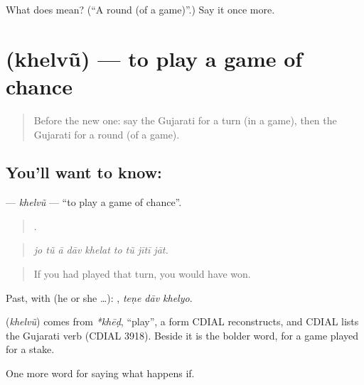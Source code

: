 \begin{tcolorbox}[breakable,colback=teal!4,colframe=teal!35!black,title={Before you move on}]
What does  mean? (\textquotedblleft{}A round (of a game)\textquotedblright{}.) Say it once more.
\end{tcolorbox}
\section[\texorpdfstring{\gu{ખેલવું} (khelvũ)}{ખેલવું (khelvũ)}]{ (khelvũ) — to play a game of chance}

\label{lesson:GU-C533-khelvu}



\begin{quote}
Before the new one: say the Gujarati for a turn (in a game), then the Gujarati for a round (of a game).
\end{quote}

\subsection*{You'll want to know: }
\textbf{} — \emph{khelvũ} — \textquotedblleft{}to play a game of chance\textquotedblright{}.

\begin{quote}
        .
\end{quote}

\begin{quote}
\emph{jo tũ ā dāv khelat to tũ jītī jāt.}
\end{quote}

\begin{quote}
If you had played that turn, you would have won.
\end{quote}

Past, with  (he or she …):   , \emph{teṇe dāv khelyo}.

\begin{cousinweb}
\textbf{} (\emph{khelvũ}) comes from \emph{*khēḍ}, \textquotedblleft{}play\textquotedblright{}, a form CDIAL reconstructs, and CDIAL lists the Gujarati verb (CDIAL 3918). Beside \textbf{} it is the bolder word, for a game played for a stake.
\end{cousinweb}

\begin{grammarlens}[title={What you've built}]
One more word for saying what happens if.
\end{grammarlens}

